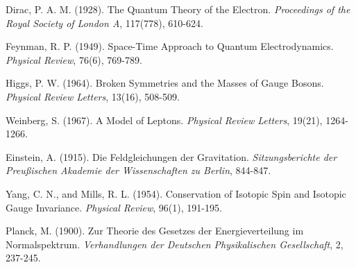 \documentclass[12pt,a4paper]{article}
\numberwithin{equation}{section}
\begin{document}
\begin{thebibliography}{99}
		Dirac, P. A. M. (1928). The Quantum Theory of the Electron. \emph{Proceedings of the Royal Society of London A}, 117(778), 610-624.
		
		Feynman, R. P. (1949). Space-Time Approach to Quantum Electrodynamics. \emph{Physical Review}, 76(6), 769-789.
		
		Higgs, P. W. (1964). Broken Symmetries and the Masses of Gauge Bosons. \emph{Physical Review Letters}, 13(16), 508-509.
		
		Weinberg, S. (1967). A Model of Leptons. \emph{Physical Review Letters}, 19(21), 1264-1266.
		
		Einstein, A. (1915). Die Feldgleichungen der Gravitation. \emph{Sitzungsberichte der Preußischen Akademie der Wissenschaften zu Berlin}, 844-847.
		
		Yang, C. N., and Mills, R. L. (1954). Conservation of Isotopic Spin and Isotopic Gauge Invariance. \emph{Physical Review}, 96(1), 191-195.
		
		Planck, M. (1900). Zur Theorie des Gesetzes der Energieverteilung im Normalspektrum. \emph{Verhandlungen der Deutschen Physikalischen Gesellschaft}, 2, 237-245.
		
	\end{thebibliography}
	
\end{document}
